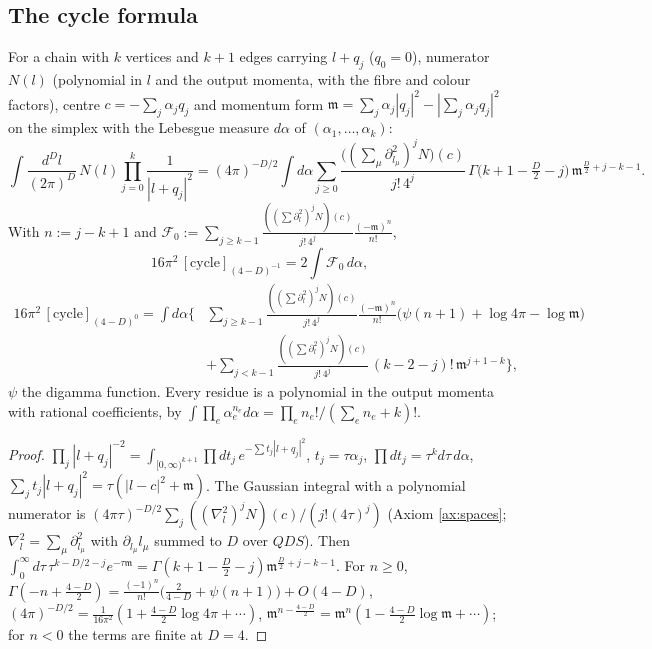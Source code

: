 \subsection{The cycle formula}

\begin{theorem}
\label{thm:res}
For a chain with $k$ vertices and $k+1$ edges carrying $l+q_j$ ($q_0=0$), numerator $N(l)$ (polynomial in $l$ and the output momenta, with the fibre and colour factors), centre $c=-\sum_j\alpha_jq_j$ and momentum form $\mathfrak m=\sum_j\alpha_j|q_j|^2-|\sum_j\alpha_jq_j|^2$ on the simplex with the Lebesgue measure $d\alpha$ of $(\alpha_1,\dots,\alpha_k)$:
\begin{equation}
\int\frac{d^Dl}{(2\pi)^D}\,N(l)\prod_{j=0}^k\frac1{|l+q_j|^2}=(4\pi)^{-D/2}\int d\alpha\sum_{j\ge0}\frac{\big((\sum_\mu\partial^2_{l_\mu})^jN\big)(c)}{j!\,4^j}\,\Gamma\Big(k+1-\tfrac D2-j\Big)\,\mathfrak m^{\frac D2+j-k-1}.
\label{eq:cycleD}
\end{equation}
With $n:=j-k+1$ and $\mathcal F_0:=\sum_{j\ge k-1}\frac{((\sum\partial^2_l)^jN)(c)}{j!\,4^j}\frac{(-\mathfrak m)^{n}}{n!}$,
\begin{equation}
16\pi^2\,[\text{cycle}]_{(4-D)^{-1}}=2\int\mathcal F_0\,d\alpha,
\label{eq:resD}
\end{equation}
\begin{equation}
\begin{aligned}
16\pi^2\,[\text{cycle}]_{(4-D)^{0}}=\int d\alpha\Big\{&\sum_{j\ge k-1}\frac{((\sum\partial^2_l)^jN)(c)}{j!\,4^j}\frac{(-\mathfrak m)^n}{n!}\big(\psi(n+1)+\log4\pi-\log\mathfrak m\big)\\
&+\sum_{j<k-1}\frac{((\sum\partial^2_l)^jN)(c)}{j!\,4^j}\,(k-2-j)!\,\mathfrak m^{j+1-k}\Big\},
\end{aligned}
\label{eq:finD}
\end{equation}
$\psi$ the digamma function. Every residue is a polynomial in the output momenta with rational coefficients, by $\int\prod_e\alpha_e^{n_e}d\alpha=\prod_en_e!/(\sum_en_e+k)!$.
\end{theorem}

\begin{proof}
$\prod_j|l+q_j|^{-2}=\int_{[0,\infty)^{k+1}}\prod dt_j\,e^{-\sum t_j|l+q_j|^2}$, $t_j=\tau\alpha_j$, $\prod dt_j=\tau^kd\tau\,d\alpha$, $\sum_jt_j|l+q_j|^2=\tau(|l-c|^2+\mathfrak m)$. The Gaussian integral with a polynomial numerator is $(4\pi\tau)^{-D/2}\sum_j((\nabla^2_l)^jN)(c)/(j!(4\tau)^j)$ (Axiom \ref{ax:spaces}; $\nabla^2_l=\sum_\mu\partial_{l_\mu}^2$ with $\partial_{l_\mu}l_\mu$ summed to $D$ over $QDS$). Then $\int_0^\infty d\tau\,\tau^{k-D/2-j}e^{-\tau\mathfrak m}=\Gamma(k+1-\frac D2-j)\mathfrak m^{\frac D2+j-k-1}$. For $n\ge0$, $\Gamma(-n+\frac{4-D}2)=\frac{(-1)^n}{n!}\big(\frac2{4-D}+\psi(n+1)\big)+O(4-D)$, $(4\pi)^{-D/2}=\frac1{16\pi^2}(1+\frac{4-D}2\log4\pi+\cdots)$, $\mathfrak m^{n-\frac{4-D}2}=\mathfrak m^n(1-\frac{4-D}2\log\mathfrak m+\cdots)$; for $n<0$ the terms are finite at $D=4$.
\end{proof}

